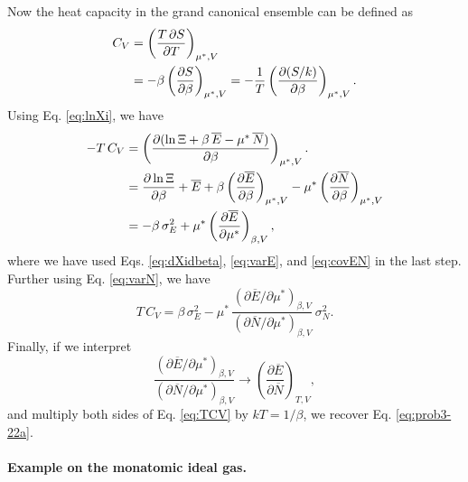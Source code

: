 \documentclass[twocolumn, 10pt]{article}
\numberwithin{equation}{section}
\newenvironment{solution}[1][\empty]
{\par\medskip
  \textbf{\ifx\empty#1{Solution.}\relax\else{#1}\fi} \ignorespaces}
{\medskip}
\begin{document}
\begin{solution}
Now the heat capacity in the grand canonical ensemble can be defined as
%
\begin{align}
C_V
&= \left( \frac{ T \, \partial S } { \partial T } \right)_{\mu^*, V}
\notag \\
&= -\beta \left( \frac{ \partial S } { \partial \beta } \right)_{\mu^*, V}
= -\frac{1}{T} \left( \frac{ \partial (S/k) } { \partial \beta } \right)_{\mu^*, V}.
\label{eq:CV_def}
\end{align}
%
Using Eq. \eqref{eq:lnXi}, we have
\begin{align}
-T \, C_V
  &= \left( \frac{ \partial (\ln \Xi + \beta \, \overline E - \mu^* \, \overline N) }
  { \partial \beta } \right)_{\mu^*, V}.
  \notag
  \\
  &= \frac{ \partial \ln \Xi } { \partial \beta }
  + \overline E
  + \beta \left( \frac{ \partial \overline E } { \partial \beta } \right)_{\mu^*, V}
  - \mu^* \left( \frac{ \partial \overline N } { \partial \beta } \right)_{\mu^*, V}
  \notag
  \\
  &=
  - \beta \, \sigma_E^2
  + \mu^* \left( \frac{ \partial \overline E } { \partial \mu^* } \right)_{\beta, V}
  ,
  \notag
\end{align}
%
where we have used Eqs. \eqref{eq:dXidbeta}, \eqref{eq:varE}, and \eqref{eq:covEN}
in the last step.
%
Further using Eq. \eqref{eq:varN}, we have
\begin{equation}
T \, C_V
=
\beta \, \sigma_E^2
-
\mu^* \,
\frac{ \left( \partial \overline E / \partial \mu^* \right)_{\beta, V} }
     { \left( \partial \overline N / \partial \mu^* \right)_{\beta, V} }
\, \sigma_N^2
.
\label{eq:TCV}
\end{equation}
%
Finally, if we interpret
$$
\frac{ \left( \partial \overline E / \partial \mu^* \right)_{\beta, V} }
     { \left( \partial \overline N / \partial \mu^* \right)_{\beta, V} }
\to
\left(
  \frac{ \partial \overline E }
       { \partial \overline N }
\right)_{T, V}
,
$$
and multiply both sides of Eq. \eqref{eq:TCV} by $k T = 1/\beta$,
we recover Eq. \eqref{eq:prob3-22a}.

\paragraph*{Example on the monatomic ideal gas.}


\end{solution}
\end{document}
